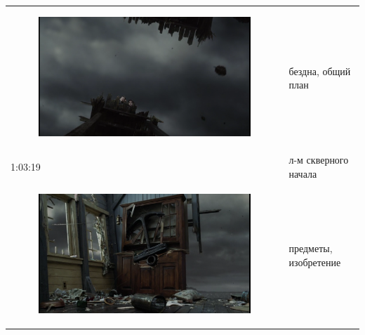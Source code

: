 \begin{longtable}[]{@{}ll@{}}
\begin{minipage}[t]{0.39\columnwidth}
\begin{figure}
\centering
\includegraphics{IMG/LS_HH_BB.png}
\caption{}
\end{figure}
\strut
\end{minipage} & \begin{minipage}[t]{0.31\columnwidth}\raggedright\strut
бездна, общий план\strut
\end{minipage}\tabularnewline
\begin{minipage}[t]{0.39\columnwidth}\raggedright\strut
1:03:19\strut
\end{minipage} & \begin{minipage}[t]{0.31\columnwidth}\raggedright\strut
л-м скверного начала\strut
\end{minipage}\tabularnewline
\begin{minipage}[t]{0.39\columnwidth}\raggedright\strut
\begin{figure}
\centering
\includegraphics{IMG/LS_HH_euristic.png}
\caption{}
\end{figure}
\strut
\end{minipage} & \begin{minipage}[t]{0.31\columnwidth}\raggedright\strut
предметы, изобретение\strut

\end{minipage}
\end{longtable}
